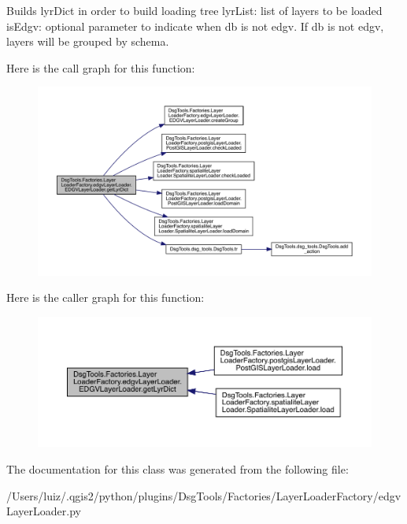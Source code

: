 \begin{DoxyVerb}Builds lyrDict in order to build loading tree
lyrList: list of layers to be loaded
isEdgv: optional parameter to indicate when db is not edgv. If db is not edgv, layers will be grouped by schema.
\end{DoxyVerb}
 Here is the call graph for this function\+:
\nopagebreak
\begin{figure}[H]
\begin{center}
\leavevmode
\includegraphics[width=350pt]{class_dsg_tools_1_1_factories_1_1_layer_loader_factory_1_1edgv_layer_loader_1_1_e_d_g_v_layer_loader_aa97ded5b4d2c3e931133f8d81db56d1e_cgraph}
\end{center}
\end{figure}
Here is the caller graph for this function\+:
\nopagebreak
\begin{figure}[H]
\begin{center}
\leavevmode
\includegraphics[width=350pt]{class_dsg_tools_1_1_factories_1_1_layer_loader_factory_1_1edgv_layer_loader_1_1_e_d_g_v_layer_loader_aa97ded5b4d2c3e931133f8d81db56d1e_icgraph}
\end{center}
\end{figure}


The documentation for this class was generated from the following file\+:\begin{DoxyCompactItemize}
\item 
/\+Users/luiz/.\+qgis2/python/plugins/\+Dsg\+Tools/\+Factories/\+Layer\+Loader\+Factory/edgv\+Layer\+Loader.\+py\end{DoxyCompactItemize}
